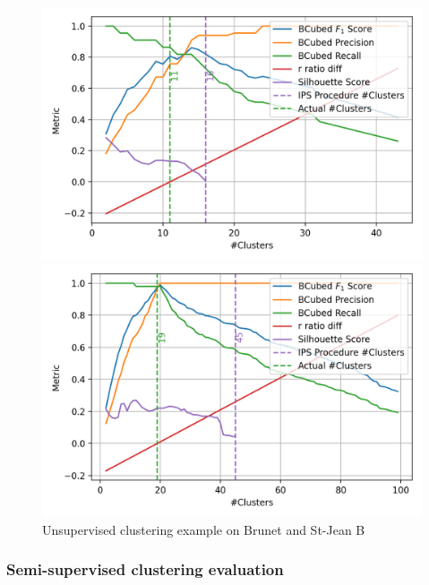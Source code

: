 \begin{figure}
  \caption{Unsupervised clustering example on Brunet and St-Jean B}
  \label{fig:unsupervised_clustering}

  \label{fig:unsupervised_clustering_brunet}
  \includegraphics[width=\linewidth]{img/unsupervised_clustering_brunet.png}

  \vspace{0.5cm}

  \label{fig:unsupervised_clustering_st_jean_B}
  \includegraphics[width=\linewidth]{img/unsupervised_clustering_st_jean_B.png}
\end{figure}


\subsubsection{Semi-supervised clustering evaluation}

